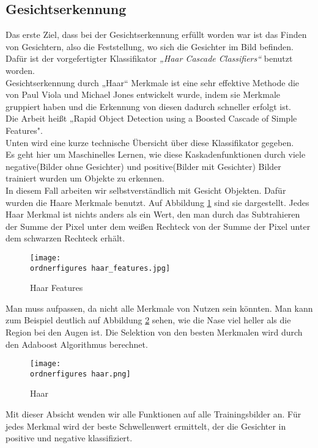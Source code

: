 \subsection{Gesichtserkennung}

\begin{flushleft}
	
	Das erste Ziel, dass bei der Gesichtserkennung erfüllt worden war ist das Finden
	von Gesichtern, also die Feststellung, wo sich die Gesichter im Bild befinden.
	\\ 
	Dafür ist der vorgefertigter Klassifikator \textit{„Haar Cascade Classifiers“}
	benutzt worden. \\ 
	Gesichtserkennung durch „Haar“ Merkmale ist eine sehr effektive Methode die von
	Paul Viola und Michael Jones entwickelt wurde, indem sie Merkmale gruppiert
	haben und die Erkennung von diesen dadurch schneller erfolgt ist. \\ 
	Die Arbeit heißt „Rapid Object Detection using a Boosted Cascade of Simple
	Features". \cite{Viola01robustreal-time}\\
	
	
	Unten wird eine kurze technische Übersicht über diese Klassifikator gegeben.\\
	
	Es geht hier um Maschinelles Lernen, wie diese Kaskadenfunktionen durch viele
	negative(Bilder ohne Gesichter) und positive(Bilder mit Gesichter) Bilder
	trainiert wurden um Objekte zu erkennen.\\ 
	In diesem Fall  arbeiten wir selbstverständlich mit Gesicht Objekten. 
	Dafür wurden die Haare Merkmale benutzt. Auf Abbildung \ref{fig:haar features}
	sind sie dargestellt. Jedes Haar Merkmal ist nichts anders als ein Wert, den man
	durch das Subtrahieren der Summe der Pixel unter dem weißen Rechteck von der
	Summe der Pixel unter dem schwarzen Rechteck erhält. \\
	\begin{figure}[H]
		\centering
		\texttt{[image: \\ordnerfigures haar\_features.jpg]}
		\caption{ Haar Features\cite{Viola01robustreal-time}}
		\label{fig:haar features}
	\end{figure}
	
	Man muss aufpassen, da nicht alle Merkmale von Nutzen sein könnten. Man kann zum
	Beispiel deutlich auf Abbildung \ref{fig:haar} sehen, wie die Nase viel heller
	als die Region bei den Augen ist. Die Selektion von den besten Merkmalen wird
	durch den Adaboost Algorithmus berechnet. 
	
	\begin{figure}[H]
		\centering
		\texttt{[image: \\ordnerfigures haar.png]}
		\caption{Haar}
		\label{fig:haar}
	\end{figure}
	
	Mit dieser Absicht wenden wir alle Funktionen auf alle Trainingsbilder an. Für
	jedes Merkmal wird der beste Schwellenwert ermittelt, der die Gesichter in
	positive und negative klassifiziert.\\\
	
\end{flushleft}


